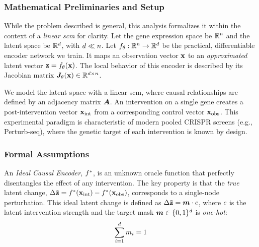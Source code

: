 \subsubsection{Mathematical Preliminaries and Setup}
\label{app:proofs:spillover:setup}

While the problem described is general, this analysis formalizes it within the context of a \emph{linear \gls{scm}} for clarity.
Let the gene expression space be $\mathbb{R}^n$ and the latent space be $\mathbb{R}^d$, with $d \ll n$.
Let $f_\theta: \mathbb{R}^n \to \mathbb{R}^d$ be the practical, differentiable encoder network we train.
It maps an observation vector ${\mathbf{x}}$ to an \emph{approximated} latent vector ${\mathbf{z}} = f_\theta({\mathbf{x}})$.
The local behavior of this encoder is described by its Jacobian matrix ${\bm{J}}_\theta({\mathbf{x}}) \in \mathbb{R}^{d \times n}$.

We model the latent space with a linear \gls{scm}, where causal relationships are defined by an adjacency matrix ${\bm{A}}$.
An intervention on a single gene creates a post-intervention vector ${\mathbf{x}}_{\text{int}}$ from a corresponding control vector ${\mathbf{x}}_{\text{obs}}$.
This experimental paradigm is characteristic of modern pooled CRISPR screens (e.g., Perturb-seq), where the genetic target of each intervention is known by design.

\subsubsection{Formal Assumptions}
\label{app:proofs:spillover:assumptions}

\begin{assumption}
\label{assump:app:ideal_encoder}
An \emph{Ideal Causal Encoder}, $f^*$, is an unknown oracle function that perfectly disentangles the effect of any intervention.
The key property is that the \emph{true} latent change, $\Delta\tilde{{\mathbf{z}}} = f^*({\mathbf{x}}_{\text{int}}) - f^*({\mathbf{x}}_{\text{obs}})$, corresponds to a single-node perturbation.
This ideal latent change is defined as $\Delta\tilde{{\mathbf{z}}} = {\bm{m}} \cdot c$, where $c$ is the latent intervention strength and the target mask ${\bm{m}} \in \{0, 1\}^d$ is \emph{one-hot}:
\begin{equation}
\sum_{i=1}^{d} m_i = 1
\label{eq:app:one-hot}
\end{equation}
\end{assumption}

